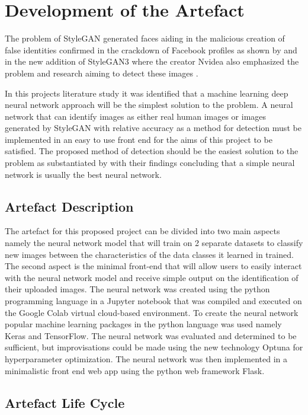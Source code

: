 \chapter{Development of the Artefact}

The problem of StyleGAN generated faces aiding in the malicious creation of false identities confirmed in the crackdown of Facebook profiles as shown by \cite{Chandler2016} and in the new addition of StyleGAN3 where the creator Nvidea also emphasized the problem and research aiming to detect these images \citep{Karras2021}.

In this projects literature study it was identified that a machine learning deep neural network approach will be the simplest solution to the problem. A neural network that can identify images as either real human images or images generated by StyleGAN with relative accuracy as a method for detection must be implemented in an easy to use front end for the aims of this project to be satisfied. The proposed method of detection should be the easiest solution to the problem as substantiated by \cite{rasmussen2001} with their findings concluding that a simple neural network is usually the best neural network.

\section{Artefact Description}

The artefact for this proposed project can be divided into two main aspects namely the neural network model that will train on 2 separate datasets to classify new images between the characteristics of the data classes it learned in trained. The second aspect is the minimal front-end that will allow users to easily interact with the neural network model and receive simple output on the identification of their uploaded images. The neural network was created using the python programming language in a Jupyter notebook that was compiled and executed on the Google Colab virtual cloud-based environment. To create the neural network popular machine learning packages in the python language was used namely Keras and TensorFlow. The neural network was evaluated and determined to be sufficient, but improvisations could be made using the new technology Optuna for hyperparameter optimization. The neural network was then implemented in a minimalistic front end web app using the python web framework Flask.

\section{Artefact Life Cycle}


